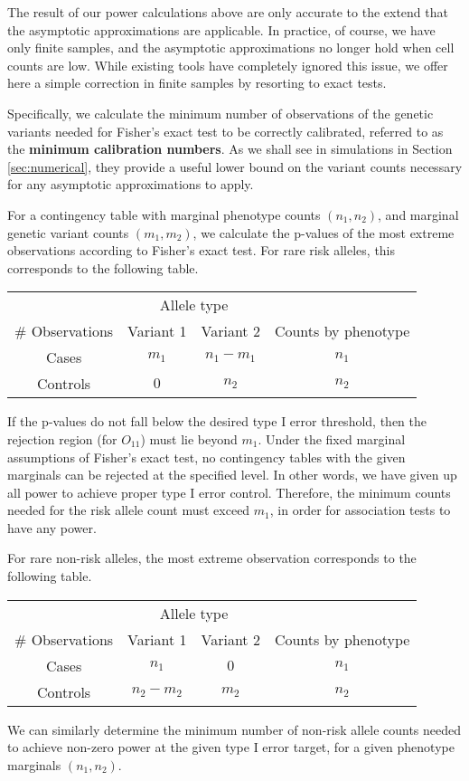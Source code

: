 
The result of our power calculations above are only accurate to the extend that the asymptotic approximations are applicable.
In practice, of course, we have only finite samples, and the asymptotic approximations no longer hold when cell counts are low.
While existing tools have completely ignored this issue, we offer here a simple correction in finite samples by resorting to exact tests.

Specifically, we calculate the minimum number of observations of the genetic variants needed for Fisher's exact test to be correctly calibrated, referred to as the {\bf minimum calibration numbers}.
As we shall see in simulations in Section \ref{sec:numerical}, they provide a useful lower bound on the variant counts necessary for any asymptotic approximations to apply.

For a contingency table with marginal phenotype counts $(n_1, n_2)$, and marginal genetic variant counts $(m_1, m_2)$, we calculate the p-values of the most extreme observations according to Fisher's exact test.
For rare risk alleles, this corresponds to the following table.
\begin{center}
    \begin{tabular}{cccc}
    \hline
    & \multicolumn{2}{c}{Allele type} \\
    \cline{2-3}
    \# Observations & Variant 1 & Variant 2 & Counts by phenotype \\
    \hline
    Cases & $m_1$ & $n_1-m_1$ & $n_1$ \\
    Controls & $0$ & $n_2$ & $n_2$ \\
    \hline
    \end{tabular}
\end{center}
If the p-values do not fall below the desired type I error threshold, then the rejection region (for $O_{11}$) must lie beyond $m_1$. 
Under the fixed marginal assumptions of Fisher's exact test, no contingency tables with the given marginals can be rejected at the specified level.
In other words, we have given up all power to achieve proper type I error control.
Therefore, the minimum counts needed for the risk allele count must exceed $m_1$, in order for association tests to have any power.

For rare non-risk alleles, the most extreme observation corresponds to the following table.
\begin{center}
    \begin{tabular}{cccc}
    \hline
    & \multicolumn{2}{c}{Allele type} \\
    \cline{2-3}
    \# Observations & Variant 1 & Variant 2 & Counts by phenotype\\
    \hline
    Cases & $n_1$ & $0$ & $n_1$ \\
    Controls & $n_2-m_2$ & $m_2$ & $n_2$ \\
    \hline
    \end{tabular}
\end{center}
We can similarly determine the minimum number of non-risk allele counts needed to achieve non-zero power at the given type I error target, for a given phenotype marginals $(n_1, n_2)$.

